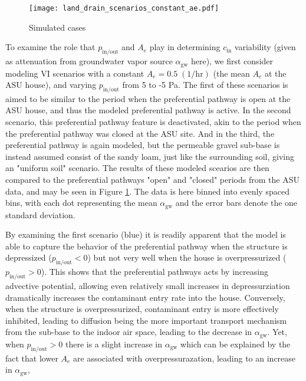 \documentclass[journal=esthag,manuscript=article]{achemso}
\begin{document}
\begin{figure}[!h] %
	\centering
  \caption{Simulated cases}
  \label{fig:land_drain_scenarios_constant_ae}
  \texttt{[image: land\_drain\_scenarios\_constant\_ae.pdf]}
\end{figure}

To examine the role that $p_\mathrm{in/out}$ and $A_e$ play in determining $c_\mathrm{in}$ variability (given as attenuation from groundwater vapor source $\alpha_\mathrm{gw}$ here), we first consider modeling VI scenarios with a constant $A_e = 0.5 \; \mathrm{(1/hr)}$ (the mean $A_e$ at the ASU house), and varying $p_\mathrm{in/out}$ from 5 to -5 Pa.
The first of these scenarios is aimed to be similar to the period when the preferential pathway is open at the ASU house, and thus the modeled preferential pathway is active.
In the second scenario, this preferential pathway feature is deactivated, akin to the period when the preferential pathway was closed at the ASU site.
And in the third, the preferential pathway is again modeled, but the permeable gravel sub-base is instead assumed consist of the sandy loam, just like the surrounding soil, giving an "uniform soil" scenario. %
The results of these modeled scearios are then compared to the preferential pathways "open" and "closed" periods from the ASU data, and may be seen in Figure \ref{fig:land_drain_scenarios_constant_ae}.
The data is here binned into evenly spaced bins, with each dot representing the mean $\alpha_\mathrm{gw}$ and the error bars denote the one standard deviation.

By examining the first scenario (blue) it is readily apparent that the model is able to capture the behavior of the preferential pathway when the structure is depressized ($p_\mathrm{in/out} < 0$) but not very well when the house is overpressurized ($p_\mathrm{in/out} > 0$).
This shows that the preferential pathways acts by increasing advective potential, allowing even relatively small increases in depressurziation dramatically increases the contaminant entry rate into the house.
Conversely, when the structure is overpressurized, contaminant entry is more effectively inhibited, leading to diffusion being the more important transport mechanism from the sub-base to the indoor air space, leading to the decrease in $\alpha_\mathrm{gw}$.
Yet, when $p_\mathrm{in/out} > 0$ there is a slight increase in $\alpha_\mathrm{gw}$ which can be explained by the fact that lower $A_e$ are associated with overpressurazation, leading to an increase in $\alpha_\mathrm{gw}$,
\end{document}
